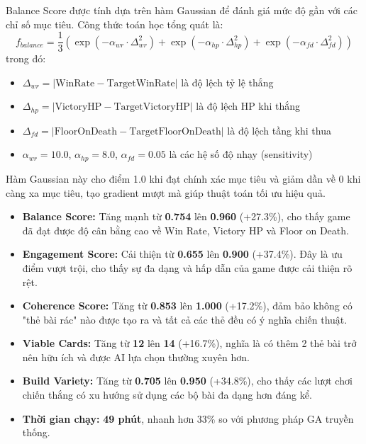 Balance Score được tính dựa trên hàm Gaussian để đánh giá mức độ gần với các chỉ số mục tiêu. Công thức toán học tổng quát là:
\begin{equation}
f_{balance} = \frac{1}{3}\left(\exp(-\alpha_{wr} \cdot \Delta_{wr}^2) + \exp(-\alpha_{hp} \cdot \Delta_{hp}^2) + \exp(-\alpha_{fd} \cdot \Delta_{fd}^2)\right)
\end{equation}
trong đó:
\begin{itemize}
    \item $\Delta_{wr} = |\text{WinRate} - \text{TargetWinRate}|$ là độ lệch tỷ lệ thắng
    \item $\Delta_{hp} = |\text{VictoryHP} - \text{TargetVictoryHP}|$ là độ lệch HP khi thắng
    \item $\Delta_{fd} = |\text{FloorOnDeath} - \text{TargetFloorOnDeath}|$ là độ lệch tầng khi thua
    \item $\alpha_{wr} = 10.0$, $\alpha_{hp} = 8.0$, $\alpha_{fd} = 0.05$ là các hệ số độ nhạy (sensitivity)
\end{itemize}
Hàm Gaussian này cho điểm 1.0 khi đạt chính xác mục tiêu và giảm dần về 0 khi càng xa mục tiêu, tạo gradient mượt mà giúp thuật toán tối ưu hiệu quả.

\begin{itemize}
    \item \textbf{Balance Score:} Tăng mạnh từ \textbf{0.754} lên \textbf{0.960} (+27.3\%), cho thấy game đã đạt được độ cân bằng cao về Win Rate, Victory HP và Floor on Death.
    \item \textbf{Engagement Score:} Cải thiện từ \textbf{0.655} lên \textbf{0.900} (+37.4\%). Đây là ưu điểm vượt trội, cho thấy sự đa dạng và hấp dẫn của game được cải thiện rõ rệt.
    \item \textbf{Coherence Score:} Tăng từ \textbf{0.853} lên \textbf{1.000} (+17.2\%), đảm bảo không có "thẻ bài rác" nào được tạo ra và tất cả các thẻ đều có ý nghĩa chiến thuật.
    \item \textbf{Viable Cards:} Tăng từ \textbf{12} lên \textbf{14} (+16.7\%), nghĩa là có thêm 2 thẻ bài trở nên hữu ích và được AI lựa chọn thường xuyên hơn.
    \item \textbf{Build Variety:} Tăng từ \textbf{0.705} lên \textbf{0.950} (+34.8\%), cho thấy các lượt chơi chiến thắng có xu hướng sử dụng các bộ bài đa dạng hơn đáng kể.
    \item \textbf{Thời gian chạy:} \textbf{49 phút}, nhanh hơn 33\% so với phương pháp GA truyền thống.
\end{itemize}

